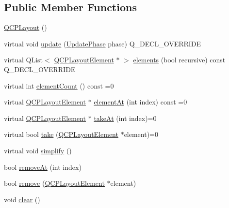 \subsection*{Public Member Functions}
\begin{DoxyCompactItemize}
\item 
\hyperlink{classQCPLayout_a04222e6e1361fd802d48f1a25b7020d4}{Q\+C\+P\+Layout} ()
\item 
virtual void \hyperlink{classQCPLayout_a48ecc9c98ea90b547c3e27a931a8f7bd}{update} (\hyperlink{classQCPLayoutElement_a0d83360e05735735aaf6d7983c56374d}{Update\+Phase} phase) Q\+\_\+\+D\+E\+C\+L\+\_\+\+O\+V\+E\+R\+R\+I\+DE
\item 
virtual Q\+List$<$ \hyperlink{classQCPLayoutElement}{Q\+C\+P\+Layout\+Element} $\ast$ $>$ \hyperlink{classQCPLayout_aca129722c019f91d3367046f80abfa77}{elements} (bool recursive) const Q\+\_\+\+D\+E\+C\+L\+\_\+\+O\+V\+E\+R\+R\+I\+DE
\item 
virtual int \hyperlink{classQCPLayout_a39d3e9ef5d9b82ab1885ba1cb9597e56}{element\+Count} () const =0
\item 
virtual \hyperlink{classQCPLayoutElement}{Q\+C\+P\+Layout\+Element} $\ast$ \hyperlink{classQCPLayout_afa73ca7d859f8a3ee5c73c9b353d2a56}{element\+At} (int index) const =0
\item 
virtual \hyperlink{classQCPLayoutElement}{Q\+C\+P\+Layout\+Element} $\ast$ \hyperlink{classQCPLayout_a5a79621fa0a6eabb8b520cfc04fb601a}{take\+At} (int index)=0
\item 
virtual bool \hyperlink{classQCPLayout_ada26cd17e56472b0b4d7fbbc96873e4c}{take} (\hyperlink{classQCPLayoutElement}{Q\+C\+P\+Layout\+Element} $\ast$element)=0
\item 
virtual void \hyperlink{classQCPLayout_a41e6ac049143866e8f8b4964efab01b2}{simplify} ()
\item 
bool \hyperlink{classQCPLayout_a2403f684fee3ce47132faaeed00bb066}{remove\+At} (int index)
\item 
bool \hyperlink{classQCPLayout_a6c58f537d8086f352576ab7c5b15d0bc}{remove} (\hyperlink{classQCPLayoutElement}{Q\+C\+P\+Layout\+Element} $\ast$element)
\item 
void \hyperlink{classQCPLayout_a02883bdf2769b5b227f0232dba1ac4ee}{clear} ()
\end{DoxyCompactItemize}
